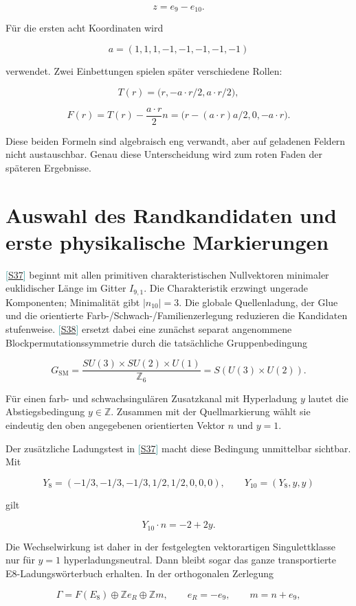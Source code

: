 \documentclass[11pt,a4paper,oneside,parskip=half,headings=normal,numbers=noenddot,bibliography=totoc]{scrreprt}
\newcommand{\src}[1]{\textcolor{teal}{\small[\hyperref[s:#1]{S#1}]}}
\begin{document}
\[
z=e_9-e_{10}.
\]

Für die ersten acht Koordinaten wird

\[
a=(1,1,1,-1,-1,-1,-1,-1)
\]

verwendet. Zwei Einbettungen spielen später verschiedene Rollen:

\[
T(r)=\bigl(r,-a\!\cdot\!r/2,a\!\cdot\!r/2\bigr),
\]

\[
F(r)=T(r)-\frac{a\!\cdot\!r}{2}n
=\bigl(r-(a\!\cdot\!r)a/2,0,-a\!\cdot\!r\bigr).
\]

Diese beiden Formeln sind algebraisch eng verwandt, aber auf geladenen Feldern nicht austauschbar. Genau diese Unterscheidung wird zum roten Faden der späteren Ergebnisse.

\section{Auswahl des Randkandidaten und erste physikalische Markierungen}

\src{37} beginnt mit allen primitiven charakteristischen Nullvektoren minimaler euklidischer Länge im Gitter \(I_{9,1}\). Die Charakteristik erzwingt ungerade Komponenten; Minimalität gibt \(|n_{10}|=3\). Die globale Quellenladung, der Glue und die orientierte Farb-/Schwach-/Familienzerlegung reduzieren die Kandidaten stufenweise. \src{38} ersetzt dabei eine zunächst separat angenommene Blockpermutationssymmetrie durch die tatsächliche Gruppenbedingung

\[
G_\mathrm{SM}=\frac{SU(3)\times SU(2)\times U(1)}{\mathbb Z_6}=S(U(3)\times U(2)).
\]

Für einen farb- und schwachsingulären Zusatzkanal mit Hyperladung \(y\) lautet die Abstiegsbedingung \(y\in\mathbb Z\). Zusammen mit der Quellmarkierung wählt sie eindeutig den oben angegebenen orientierten Vektor \(n\) und \(y=1\).

Der zusätzliche Ladungstest in \src{37} macht diese Bedingung unmittelbar sichtbar. Mit

\[
Y_8=(-1/3,-1/3,-1/3,1/2,1/2,0,0,0),\qquad
Y_{10}=(Y_8,y,y)
\]

gilt

\[
Y_{10}\cdot n=-2+2y.
\]

Die Wechselwirkung ist daher in der festgelegten vektorartigen Singulettklasse nur für \(y=1\) hyperladungsneutral. Dann bleibt sogar das ganze transportierte E8-Ladungswörterbuch erhalten. In der orthogonalen Zerlegung

\[
\Gamma=F(E_8)\oplus \mathbb Ze_R\oplus\mathbb Zm,
\qquad e_R=-e_9,\qquad m=n+e_9,
\]
\end{document}
